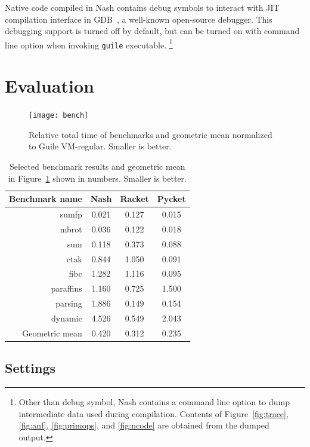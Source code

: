 \documentclass[preprint, 10pt]{sigplanconf}
\begin{document}
Native code compiled in Nash contains debug symbols to interact with JIT
compilation interface in GDB~\cite{stallman2002debugging}, a well-known
open-source debugger. This debugging support is turned off by default, but can
be turned on with command line option when invoking \texttt{guile} executable.
\footnote{Other than debug symbol, Nash contains a command line option to dump
  intermediate data used during compilation. Contents of
  Figure~\hyperref[fig:anf]{\ref{fig:trace}}, \hyperref[fig:anf]{\ref{fig:anf}},
  \hyperref[fig:primops]{\ref{fig:primops}}, and
  \hyperref[fig:ncode]{\ref{fig:ncode}} are obtained from the dumped output.}

\section{Evaluation}
\label{sec:evaluation}

\begin{figure}
  \centering
  \texttt{[image: bench]}
  \caption{Relative total time of benchmarks and geometric mean normalized to
    Guile VM-regular. Smaller is better.}
\label{fig:bench}
\end{figure}

\begin{table}
  \centering
  \begin{tabular}{rccc}
    \toprule
    Benchmark name & Nash & Racket & Pycket \\
    \midrule
    sumfp & 0.021 & 0.127 & 0.015 \\
    mbrot & 0.036 & 0.122 & 0.018 \\
    sum & 0.118 & 0.373 & 0.088 \\
    \midrule
    ctak & 0.844 & 1.050 & 0.091 \\
    fibc & 1.282 & 1.116 & 0.095 \\
    \midrule
    paraffins & 1.160 & 0.725 & 1.500 \\
    parsing & 1.886 & 0.149 & 0.154 \\
    dynamic & 4.526 & 0.549 & 2.043 \\
    \midrule
    Geometric mean & 0.420 & 0.312 & 0.235 \\
    \bottomrule
  \end{tabular}
  \caption{Selected benchmark results and geometric mean in
    Figure~\hyperref[fig:bench]{\ref{fig:bench}} shown in numbers. Smaller is
    better.}
\label{tab:bench}
\end{table}

\subsection{Settings}
\end{document}
